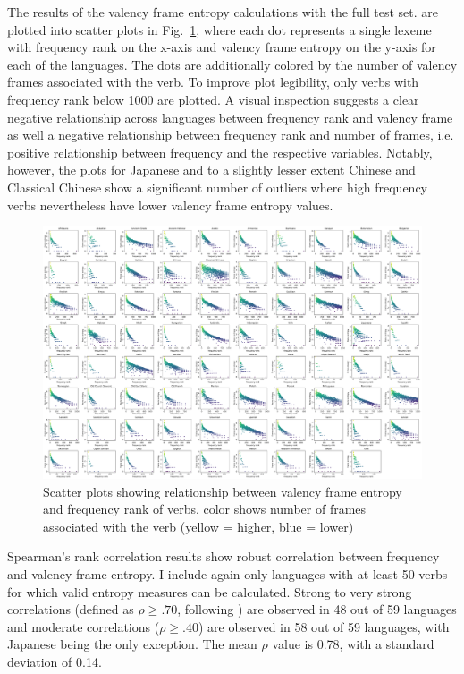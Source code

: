 The results of the valency frame entropy calculations with the full test set. are plotted into scatter plots in Fig.~\ref{fig:joint_entropy_freq}, where each dot represents a single lexeme with frequency rank on the x-axis and valency frame entropy on the y-axis for each of the languages. The dots are additionally colored by the number of valency frames associated with the verb. To improve plot legibility, only verbs with frequency rank below 1000 are plotted. A visual inspection suggests a clear negative relationship across languages between frequency rank and valency frame as well a negative relationship between frequency rank and number of frames, i.e. positive relationship between frequency and the respective variables. Notably, however, the plots for Japanese and to a slightly lesser extent Chinese and Classical Chinese show a significant number of outliers where high frequency verbs nevertheless have lower valency frame entropy values. 

\begin{figure}
  \centering
  \includegraphics[width=\textwidth]{figures/exp2/joint_entropy_freq.pdf}
  \caption{Scatter plots showing relationship between valency frame entropy and frequency rank of verbs, color shows number of frames associated with the verb (yellow = higher, blue = lower)}
  \label{fig:joint_entropy_freq}
\end{figure}

Spearman's rank correlation results show robust correlation between frequency and valency frame entropy. I include again only languages with at least 50 verbs for which valid entropy measures can be calculated. Strong to very strong correlations (defined as $\rho\geq.70$, following \citealp{schober2018}) are observed in 48 out of 59 languages and moderate correlations ($\rho\geq.40$) are observed in 58 out of 59 languages, with Japanese being the only exception.  The mean $\rho$ value is 0.78, with a standard deviation of 0.14.

